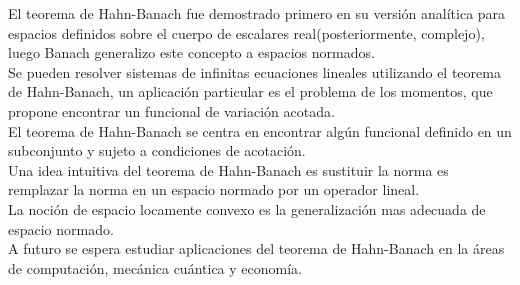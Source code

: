 \documentclass[10pt]{amsart}
\theoremstyle{remark}
\numberwithin{equation}{section}
\begin{document}
El teorema de Hahn-Banach fue demostrado primero en su versión analítica para espacios definidos sobre el cuerpo de escalares real(posteriormente, complejo), luego Banach generalizo este concepto a espacios normados.\\ 

Se pueden resolver sistemas de infinitas ecuaciones lineales utilizando el teorema de Hahn-Banach, un aplicación particular es el problema de los momentos, que propone encontrar un funcional de variación acotada.\\

El teorema de Hahn-Banach se centra en encontrar algún funcional definido en un subconjunto y sujeto a condiciones de acotación.\\

Una idea intuitiva del teorema de Hahn-Banach es sustituir la norma es remplazar la norma en un espacio normado por un operador lineal.\\

La noción de espacio locamente convexo es la generalización mas adecuada de espacio normado.\\

A futuro se espera estudiar aplicaciones del teorema de Hahn-Banach en la áreas de computación, mecánica cuántica y economía.\\ \\
\end{document}
